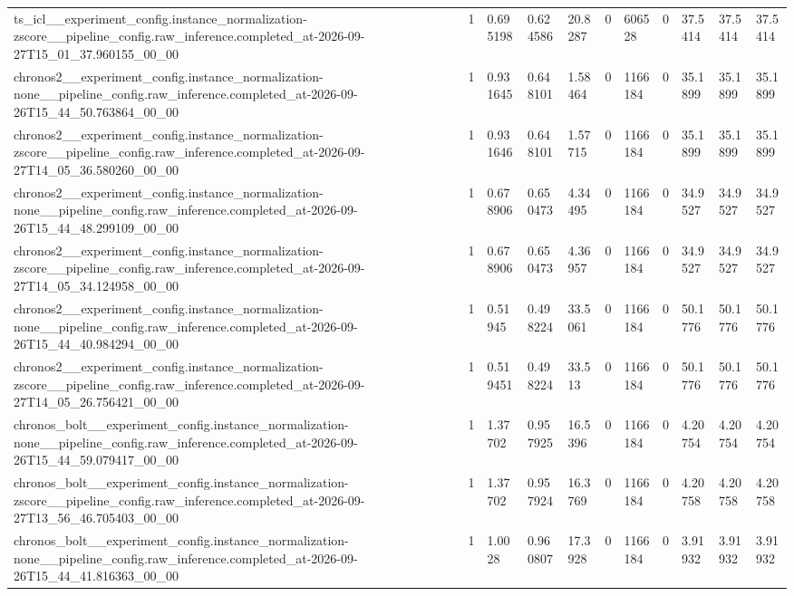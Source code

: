 \begin{tabular}{lllllllllll}
ts\_icl\_\_experiment\_config.instance\_normalization-zscore\_\_pipeline\_config.raw\_inference.completed\_at-2026-09-27T15\_01\_37.960155\_00\_00 & 1 & 0.695198 & 0.624586 & 20.8287 & 0 & 606528 & 0 & 37.5414 & 37.5414 & 37.5414 \\
chronos2\_\_experiment\_config.instance\_normalization-none\_\_pipeline\_config.raw\_inference.completed\_at-2026-09-26T15\_44\_50.763864\_00\_00 & 1 & 0.931645 & 0.648101 & 1.58464 & 0 & 1166184 & 0 & 35.1899 & 35.1899 & 35.1899 \\
chronos2\_\_experiment\_config.instance\_normalization-zscore\_\_pipeline\_config.raw\_inference.completed\_at-2026-09-27T14\_05\_36.580260\_00\_00 & 1 & 0.931646 & 0.648101 & 1.57715 & 0 & 1166184 & 0 & 35.1899 & 35.1899 & 35.1899 \\
chronos2\_\_experiment\_config.instance\_normalization-none\_\_pipeline\_config.raw\_inference.completed\_at-2026-09-26T15\_44\_48.299109\_00\_00 & 1 & 0.678906 & 0.650473 & 4.34495 & 0 & 1166184 & 0 & 34.9527 & 34.9527 & 34.9527 \\
chronos2\_\_experiment\_config.instance\_normalization-zscore\_\_pipeline\_config.raw\_inference.completed\_at-2026-09-27T14\_05\_34.124958\_00\_00 & 1 & 0.678906 & 0.650473 & 4.36957 & 0 & 1166184 & 0 & 34.9527 & 34.9527 & 34.9527 \\
chronos2\_\_experiment\_config.instance\_normalization-none\_\_pipeline\_config.raw\_inference.completed\_at-2026-09-26T15\_44\_40.984294\_00\_00 & 1 & 0.51945 & 0.498224 & 33.5061 & 0 & 1166184 & 0 & 50.1776 & 50.1776 & 50.1776 \\
chronos2\_\_experiment\_config.instance\_normalization-zscore\_\_pipeline\_config.raw\_inference.completed\_at-2026-09-27T14\_05\_26.756421\_00\_00 & 1 & 0.519451 & 0.498224 & 33.513 & 0 & 1166184 & 0 & 50.1776 & 50.1776 & 50.1776 \\
chronos\_bolt\_\_experiment\_config.instance\_normalization-none\_\_pipeline\_config.raw\_inference.completed\_at-2026-09-26T15\_44\_59.079417\_00\_00 & 1 & 1.37702 & 0.957925 & 16.5396 & 0 & 1166184 & 0 & 4.20754 & 4.20754 & 4.20754 \\
chronos\_bolt\_\_experiment\_config.instance\_normalization-zscore\_\_pipeline\_config.raw\_inference.completed\_at-2026-09-27T13\_56\_46.705403\_00\_00 & 1 & 1.37702 & 0.957924 & 16.3769 & 0 & 1166184 & 0 & 4.20758 & 4.20758 & 4.20758 \\
chronos\_bolt\_\_experiment\_config.instance\_normalization-none\_\_pipeline\_config.raw\_inference.completed\_at-2026-09-26T15\_44\_41.816363\_00\_00 & 1 & 1.0028 & 0.960807 & 17.3928 & 0 & 1166184 & 0 & 3.91932 & 3.91932 & 3.91932 \\

\end{tabular}
